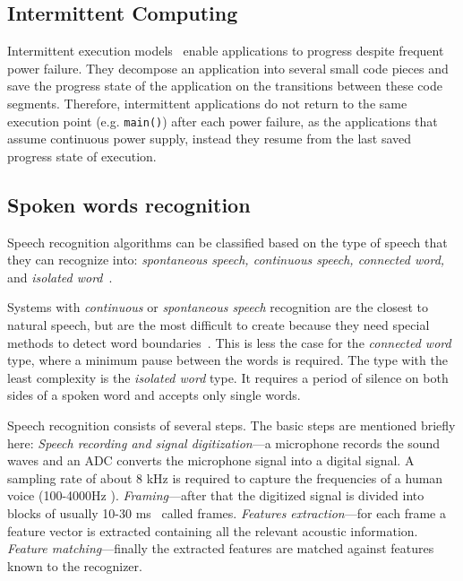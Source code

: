 \subsection{Intermittent Computing}
Intermittent execution models~\cite{van2016intermittent,colin2016chain,lucia2015simpler,bhatti2017harvos} enable applications to progress despite frequent power failure. They decompose an application into several small code pieces and save the progress state of the application on the transitions between these code segments. Therefore, intermittent applications do not return to the same execution point (e.g. \texttt{main()}) after each power failure, as the applications that assume continuous power supply, instead they resume from the last saved progress state of execution.   
\subsection{Spoken words recognition}
Speech recognition algorithms can be classified based on the type of speech that they can recognize into: \textit{spontaneous speech, continuous speech, connected word,} and \textit{isolated word}~\cite{gaikwad2010review}.

Systems with \textit{continuous} or \textit{spontaneous speech} recognition are the closest to natural speech, but are the most difficult to create because they need special methods to detect word boundaries~\cite{gaikwad2010review}. This is less the case for the \textit{connected word} type, where a minimum pause between the words is required.
 The type with the least complexity is the \textit{isolated word} type. It requires a period of silence on both sides of a spoken word and accepts only single words. 

Speech recognition consists of several steps. The basic steps are mentioned briefly here:
\textit{Speech recording and signal digitization}---a microphone records the sound waves and an ADC converts the microphone signal into a digital signal. A sampling rate of about 8 kHz is required to capture the frequencies of a human voice (100-4000Hz \cite{Bernal-Ruiz2005}). \textit{Framing}---after that the digitized signal is divided into blocks of usually 10-30 ms~\cite{gaikwad2010review,delaney2002low,delaney2005energy} called frames. \textit{Features extraction}---for each frame a feature vector is extracted containing all the relevant acoustic information. \textit{Feature matching}---finally the extracted features are matched against features known to the recognizer. 


